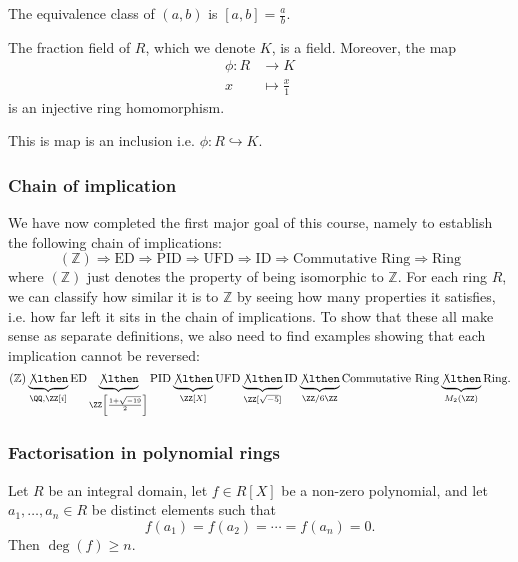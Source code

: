\documentclass[12pt, a4paper]{article}
\begin{document}
\begin{mdnote}
    The equivalence class of \((a,b)\) is \([a,b] = \frac{a}{b}\).
\end{mdnote}

\begin{mdprop}
    The fraction field of \(R\), which we denote \(K\), is a field. Moreover, the map 
    \[\begin{aligned}
        \phi: R &\to K \\
        x &\mapsto \frac{x}{1}
    \end{aligned}\] 
    is an injective ring homomorphism.
\end{mdprop}

\begin{mdnote}
    This is map is an inclusion i.e. \(\phi: R\hookrightarrow K\).
\end{mdnote}

\subsubsection{Chain of implication}

We have now completed the first major goal of this course, namely to establish the following chain of implications:
\[
(\mathbb{Z}) \Rightarrow \text{ED} \Rightarrow \text{PID} \Rightarrow \text{UFD} \Rightarrow \text{ID} \Rightarrow \text{Commutative Ring} \Rightarrow \text{Ring}
\]
where \((\mathbb{Z})\) just denotes the property of being isomorphic to \(\mathbb{Z}\). For each ring \( R \), we can classify how similar it is to \( \mathbb{Z} \) by seeing how many properties it satisfies, i.e. how far left it sits in the chain of implications. To show that these all make sense as separate definitions, we also need to find examples showing that each implication cannot be reversed:
\[
(\mathbb{Z}) \underbrace{\not\lthen}_{\QQ,\ZZ[i]} \text{ED} \underbrace{\not\lthen}_{\ZZ\left[ \frac{1+\sqrt{-19}}{2} \right]} \text{PID} \underbrace{\not\lthen}_{\ZZ[X]} \text{UFD} \underbrace{\not\lthen}_{\ZZ[\sqrt{-5}]} \text{ID} \underbrace{\not\lthen}_{\ZZ/6\ZZ} \text{Commutative Ring} \underbrace{\not\lthen}_{M_2(\ZZ)} \text{Ring}.
\]

\subsubsection{Factorisation in polynomial rings}

\begin{proposition}
    Let \(R\) be an integral domain, let \(f \in R[X]\) be a non-zero polynomial, and let \(a_1,\ldots,a_n \in R\) be distinct elements such that 
    \[f(a_1)=f(a_2)=\cdots=f(a_n)=0.\]
    Then \(\deg(f)\geq n\).
\end{proposition}
\end{document}
